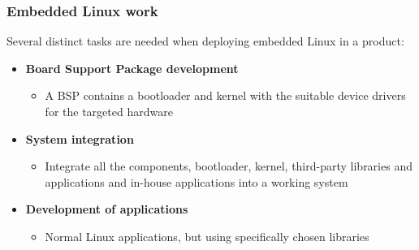 \begin{frame}
  \frametitle{Embedded Linux work}

  Several distinct tasks are needed when deploying embedded Linux in a
  product:

  \begin{itemize}
  \item {\bf Board Support Package development}
    \begin{itemize}
    \item A BSP contains a bootloader and kernel with the suitable
      device drivers for the targeted hardware
    \end{itemize}
  \item {\bf System integration}
    \begin{itemize}
    \item Integrate all the components, bootloader, kernel,
      third-party libraries and applications and in-house applications
      into a working system
    \end{itemize}
  \item {\bf Development of applications}
    \begin{itemize}
    \item Normal Linux applications, but using specifically chosen
      libraries
    \end{itemize}
  \end{itemize}
\end{frame}
